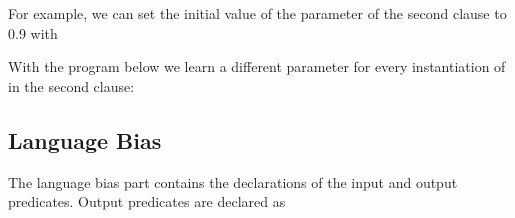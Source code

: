 \documentclass[letterpaper,10pt,english]{sphinxmanual}
\begin{document}
For example, we can set the initial value of the parameter of the second clause to 0.9 with

\begin{sphinxVerbatim}[commandchars=\\\{\}]
\PYG{p}{[} 
         
        \PYG{p}{]}
\end{sphinxVerbatim}

With the program below we learn a different parameter for every instantiation of  in the second clause:

\begin{sphinxVerbatim}[commandchars=\\\{\}]
\PYG{p}{[} 
         
        \PYG{p}{]}
\end{sphinxVerbatim}


\subsection{Language Bias}
\label{\detokenize{index:language-bias}}
The language bias part contains the declarations of the input and output predicates.
Output predicates are declared as

\begin{sphinxVerbatim}[commandchars=\\\{\}]
\end{sphinxVerbatim}
\end{document}

